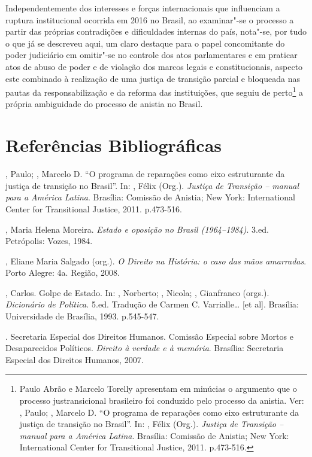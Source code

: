 Independentemente dos interesses e forças internacionais que influenciam
a ruptura institucional ocorrida em 2016 no Brasil, ao examinar"-se o
processo a partir das próprias contradições e dificuldades internas do
país, nota"-se, por tudo o que já se descreveu aqui, um claro destaque
para o papel concomitante do poder judiciário em omitir"-se no controle
dos atos parlamentares e em praticar atos de abuso de poder e de
violação dos marcos legais e constitucionais, aspecto este combinado à
realização de uma justiça de transição parcial e bloqueada nas pautas da
responsabilização e da reforma das instituições, que seguiu de
perto\footnote{Paulo Abrão e Marcelo Torelly apresentam em minúcias o
  argumento que o processo justransicional brasileiro foi conduzido pelo
  processo da anistia. Ver: , Paulo; , Marcelo D.
  ``O programa
  de reparações como eixo estruturante da justiça de transição no
  Brasil''. In: , Félix (Org.). \emph{Justiça de Transição --
  manual para a América Latina}. Brasília: Comissão de Anistia; New York:
  International Center for Transitional Justice, 2011. p.473-516.} a
própria ambiguidade do processo de anistia no Brasil.

\section{Referências Bibliográficas}

, Paulo; , Marcelo D. ``O programa de reparações como eixo
estruturante da justiça de transição no Brasil''. In: , Félix
(Org.). \emph{Justiça de Transição -- manual para a América Latina}.
Brasília: Comissão de Anistia; New York: International Center for
Transitional Justice, 2011. p.473-516.

, Maria Helena Moreira. \emph{Estado e oposição no Brasil
(1964--1984)}. 3.ed. Petrópolis: Vozes, 1984.

, Eliane Maria Salgado (org.). \emph{O Direito na História:
o caso das mãos amarradas}. Porto Alegre:  4a. Região, 2008.

, Carlos. Golpe de Estado. In: ,
Norberto; , Nicola;
, Gianfranco (orgs.). \emph{Dicionário de Política.} 5.ed.
Tradução de Carmen C. Varrialle\ldots{} {[}et al{]}. Brasília: Universidade
de Brasília, 1993. p.545-547.

. Secretaria Especial dos Direitos Humanos. Comissão Especial
sobre Mortos e Desaparecidos Políticos. \emph{Direito à verdade e à
memória}. Brasília: Secretaria Especial dos Direitos Humanos, 2007.

